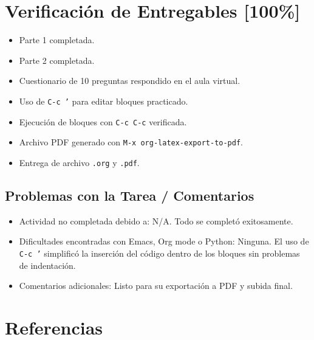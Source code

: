 \documentclass{article}
\begin{document}
\section{Verificación de Entregables [100\%]}
\label{sec:org708f7db}
\begin{itemize}
\item[{$\boxtimes$}] Parte 1 completada.
\item[{$\boxtimes$}] Parte 2 completada.
\item[{$\boxtimes$}] Cuestionario de 10 preguntas respondido en el aula virtual.
\item[{$\boxtimes$}] Uso de \texttt{C-c '} para editar bloques practicado.
\item[{$\boxtimes$}] Ejecución de bloques con \texttt{C-c C-c} verificada.
\item[{$\boxtimes$}] Archivo PDF generado con \texttt{M-x org-latex-export-to-pdf}.
\item[{$\boxtimes$}] Entrega de archivo \texttt{.org} y \texttt{.pdf}.
\end{itemize}

\subsection{Problemas con la Tarea / Comentarios}
\label{sec:orgec70224}
\begin{itemize}
\item Actividad no completada debido a: N/A. Todo se completó exitosamente.
\item Dificultades encontradas con Emacs, Org mode o Python: Ninguna. El uso de \texttt{C-c '} simplificó la inserción del código dentro de los bloques sin problemas de indentación.
\item Comentarios adicionales: Listo para su exportación a PDF y subida final.
\end{itemize}

\section{Referencias}
\label{sec:org5177527}
\printbibliography
\end{document}

